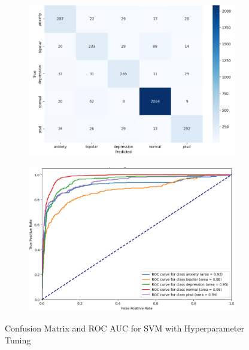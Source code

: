 \begin{figure}[h!]
    \centering
    \begin{subfigure}[b]{0.49\textwidth}
        \centering
        \includegraphics[width=\textwidth]{Images/HP SVM CM.png}
        \label{LSTMROC6}  %
    \end{subfigure}
    \hfill
    \begin{subfigure}[b]{0.49\textwidth}
        \centering
        \includegraphics[width=\textwidth]{Images/HP SVM ROC.png}
        \label{LSTMROC}  %
    \end{subfigure}
    \vspace{-1.5em}
    \caption*{Confusion Matrix and ROC AUC for SVM with Hyperparameter Tuning}
    \label{fig:hp_svm_comparison}
\end{figure}


